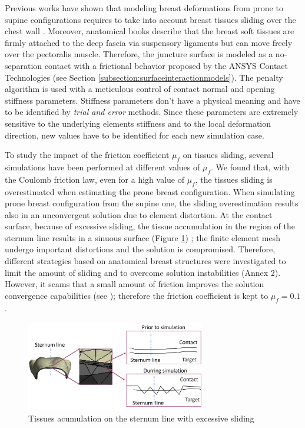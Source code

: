 Previous works have shown that modeling breast deformations from prone to supine configurations requires to take into account breast tissues sliding over the chest wall \citep{carter_application_2012,han_nonlinear_2014}. Moreover, anatomical books \citep{mugea2014aesthetic,clemente2011anatomy}  describe that the breast soft tissues are firmly attached to the deep fascia via suspensory ligaments but can move freely over the pectoralis muscle.  Therefore, the juncture surface is modeled as a no-separation contact with a frictional behavior proposed by the ANSYS Contact Technologies (see Section \ref{subsection:surfaceinteractionmodels}). The penalty algorithm is used with a meticulous control of contact normal and opening stiffness parameters. Stiffness parameters don't have a physical meaning and have to be identified by \textit{trial and error} methods. Since these parameters are extremely sensitive to the underlying elements stiffness and to the local deformation direction, new values have to be identified for each new simulation case.    

To study the impact of the friction coefficient $\mu_f$ on tissues sliding, several simulations have been performed at different values of $\mu_f$. We found that, with the Coulomb friction law, even for a high value of $\mu_f$, the tissues sliding is overestimated when estimating the prone breast configuration. When simulating prone breast configuration from the supine one, the sliding overestimation results also in an unconvergent solution due to element distortion. At the contact surface, because of excessive sliding, the tissue accumulation in the region of the sternum line results in a sinuous surface (Figure \ref{fig:overslidingProblem}) ; the finite element mesh  undergo important distortions and the solution is compromised. Therefore, different strategies based on anatomical breast structures were investigated to limit the amount of sliding and to overcome solution instabilities (Annex 2). However, it seams that a small amount of friction improves the solution convergence capabilities (see \cite{ansys_contact_2017}); therefore the friction coefficient is kept to $\mu_f = 0.1$. 
\begin{figure}[!h]
\centering
\includegraphics[width=0.7\textwidth,keepaspectratio]{figures/overslidingProblem.jpg} 
\caption{Tissues acumulation on the sternum line with excessive sliding}\label{fig:overslidingProblem}
\end{figure}
 
